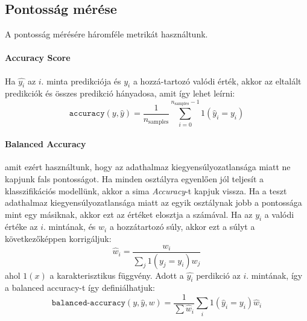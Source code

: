 \documentclass[acmtog, authorversion]{acmart}
\begin{document}
\subsection{Pontosság mérése}
A pontosság mérésére háromféle metrikát használtunk.
\paragraph{Accuracy Score}
Ha \begin{math}\hat{y_i}\end{math} az \begin{math}i\end{math}. minta predikciója és \begin{math}y_i\end{math} a hozzá-tartozó valódi érték,
akkor az eltalált predikciók és összes predikció hányadosa, amit így lehet leírni:\break
\begin{equation}
\texttt{accuracy}(y, \hat{y}) = \frac{1}{n_\text{samples}} \sum_{i=0}^{n_\text{samples}-1} 1(\hat{y}_i = y_i)
\end{equation}
\paragraph{Balanced Accuracy}
amit ezért használtunk, hogy az adathalmaz kiegyensúlyozatlansága miatt ne kapjunk fals pontosságot. Ha minden osztályra egyenlően jól teljesít a klasszifikációs modellünk, akkor a sima \emph{Accuracy}-t kapjuk vissza.
Ha a teszt adathalmaz kiegyensúlyozatlansága miatt az egyik osztálynak jobb a pontossága mint egy másiknak, akkor ezt az értéket
elosztja a számával. Ha az \begin{math}y_i\end{math} a valódi értéke az \begin{math}i\end{math}. mintának, és
\begin{math}w_i\end{math} a hozzátartozó súly, akkor ezt a súlyt a következőképpen korrigáljuk:
\begin{equation}
    \hat{w}_i = \frac{w_i}{\sum_j{1(y_j = y_i) w_j}}
\end{equation}
ahol \begin{math}1(x)\end{math} a karakterisztikus függvény. Adott a \begin{math}\hat{y_i}\end{math} perdikció az \begin{math}i\end{math}.
mintának, így a balanced accuracy-t így definiálhatjuk:
\begin{equation}
    \texttt{balanced-accuracy}(y, \hat{y}, w) = \frac{1}{\sum{\hat{w}_i}} \sum_i 1(\hat{y}_i = y_i) \hat{w}_i
\end{equation}
\end{document}
